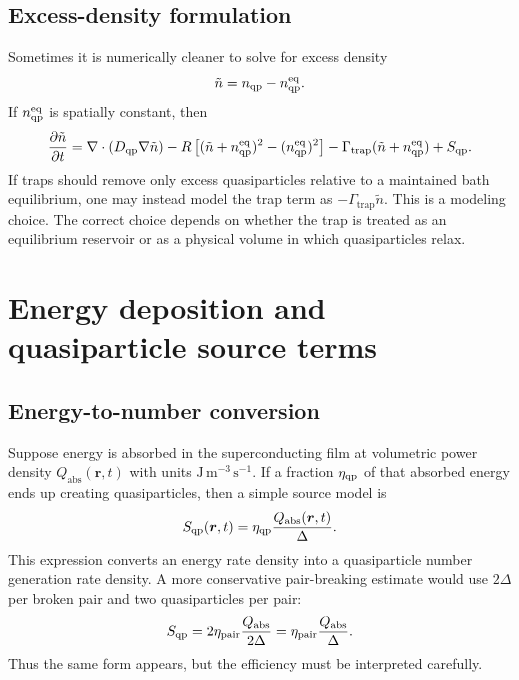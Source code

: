 \documentclass[11pt]{article}
\newcommand{\br}{{\bm{r}}}
\newcommand{\trap}{\mathrm{trap}}
\newcommand{\eq}{\mathrm{eq}}
\begin{document}
\subsection{Excess-density formulation}
Sometimes it is numerically cleaner to solve for excess density
\begin{equation}
\tilde n=n_{\qp}-n_{\qp}^{\eq}.
\end{equation}
If $n_{\qp}^{\eq}$ is spatially constant, then
\begin{equation}
\frac{\partial \tilde n}{\partial t}=\nabla\cdot(D_{\qp}\nabla\tilde n)
-R\left[(\tilde n+n_{\qp}^{\eq})^2-(n_{\qp}^{\eq})^2\right]
-\Gamma_{\trap}(\tilde n+n_{\qp}^{\eq})+S_{\qp}.
\end{equation}
If traps should remove only excess quasiparticles relative to a maintained bath equilibrium, one may instead model the trap term as $-\Gamma_{\trap}\tilde n$. This is a modeling choice. The correct choice depends on whether the trap is treated as an equilibrium reservoir or as a physical volume in which quasiparticles relax.

\section{Energy deposition and quasiparticle source terms}

\subsection{Energy-to-number conversion}
Suppose energy is absorbed in the superconducting film at volumetric power density $Q_{\mathrm{abs}}(\br,t)$ with units $\mathrm{J\,m^{-3}\,s^{-1}}$. If a fraction $\eta_{\mathrm{qp}}$ of that absorbed energy ends up creating quasiparticles, then a simple source model is
\begin{equation}
S_{\qp}(\br,t)=\eta_{\qp}\frac{Q_{\mathrm{abs}}(\br,t)}{\Delta}.
\end{equation}
This expression converts an energy rate density into a quasiparticle number generation rate density. A more conservative pair-breaking estimate would use $2\Delta$ per broken pair and two quasiparticles per pair:
\begin{equation}
S_{\mathrm{qp}}=2\eta_{\mathrm{pair}}\frac{Q_{\mathrm{abs}}}{2\Delta}=\eta_{\mathrm{pair}}\frac{Q_{\mathrm{abs}}}{\Delta}.
\end{equation}
Thus the same form appears, but the efficiency must be interpreted carefully.
\end{document}

